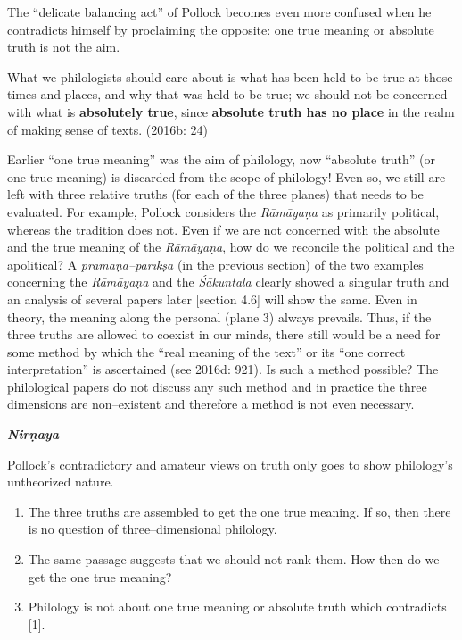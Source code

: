 
The “delicate balancing act” of Pollock becomes even more confused when he contradicts himself by proclaiming the opposite: one true meaning or absolute truth is not the aim.

\begin{myquote}
What we philologists should care about is what has been held to be true at those times and places, and why that was held to be true; we should not be concerned with what is \textbf{absolutely true}, since \textbf{absolute truth has no place} in the realm of making sense of texts. (2016b: 24)
\end{myquote}

Earlier “one true meaning” was the aim of philology, now “absolute truth” (or one true meaning) is discarded from the scope of philology! Even so, we still are left with three relative truths (for each of the three planes) that needs to be evaluated. For example, Pollock considers the \textit{Rāmāyaṇa} as primarily political, whereas the tradition does not. Even if we are not concerned with the absolute and the true meaning of the \textit{Rāmāyaṇa}, how do we reconcile the political and the apolitical? A \textit{pramāṇa–parīkṣā} (in the previous section) of the two examples concerning the \textit{Rāmāyaṇa} and the \textit{Śākuntala } clearly showed a singular truth and an analysis of several papers later [section 4.6] will show the same. Even in theory, the meaning along the personal (plane 3) always prevails. Thus, if the three truths are allowed to coexist in our minds, there still would be a need for some method by which the “real meaning of the text” or its “one correct interpretation” is ascertained (see 2016d: 921). Is such a method possible? The philological papers do not discuss any such method and in practice the three dimensions are non–existent and therefore a method is not even necessary.

\textit{\textbf{Nirṇaya}}

Pollock’s contradictory and amateur views on truth only goes to show philology’s untheorized nature.

\begin{enumerate}
\itemsep=0pt
\item The three truths are assembled to get the one true meaning. If so, then there is no question of three–dimensional philology.

 \item The same passage suggests that we should not rank them. How then do we get the one true meaning?

 \item Philology is not about one true meaning or absolute truth which contradicts [1].

\end{enumerate}

